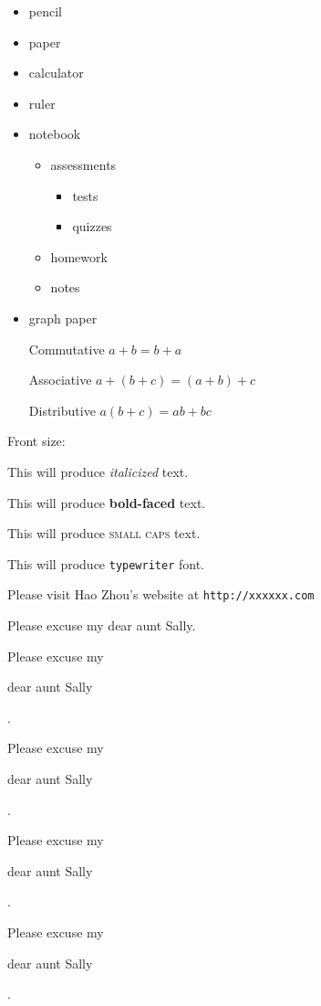 \documentclass[11pt]{article}
\begin{document}
\begin{itemize}
\item pencil
\item paper
\item calculator
\item ruler
\item notebook
	\begin{itemize}
	\item assessments
		\begin{itemize}
		\item tests
		\item quizzes
		\end{itemize}
	\item homework
	\item notes
	\end{itemize}
\item graph paper
\end{itemize}

\begin{enumerate}
\item[Commutative] $a+b=b+a$
\item[Associative] $a+(b+c)=(a+b)+c$
\item[Distributive] $a(b+c)=ab+bc$
\end{enumerate}

Front size:

This will produce \textit{italicized} text.

This will produce \textbf{bold-faced} text.

This will produce \textsc{small caps} text.

This will produce \texttt{typewriter} font.

Please visit Hao Zhou's website at \texttt{http://xxxxxx.com}

Please excuse my dear aunt Sally.

Please excuse my \begin{large}dear aunt Sally\end{large}.

Please excuse my \begin{Large}dear aunt Sally\end{Large}.

Please excuse my \begin{LARGE}dear aunt Sally\end{LARGE}. 

Please excuse my \begin{huge}dear aunt Sally\end{huge}.
\end{document}
